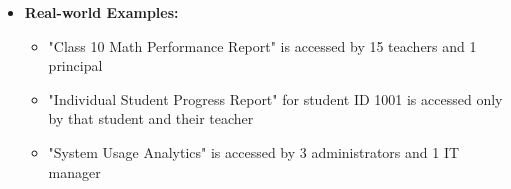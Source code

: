 \documentclass[12pt,a4paper,oneside]{book}
\begin{document}
\begin{itemize}
\begin{itemize}
            \item Teachers can access reports for their students and courses
            \item Administrators can access institution-wide reports and system metrics
            \item Report access is logged for audit and compliance purposes
        \end{itemize}
    \item \textbf{Real-world Examples:}
        \begin{itemize}
            \item "Class 10 Math Performance Report" is accessed by 15 teachers and 1 principal
            \item "Individual Student Progress Report" for student ID 1001 is accessed only by that student and their teacher
            \item "System Usage Analytics" is accessed by 3 administrators and 1 IT manager
        \end{itemize}
\end{itemize}
\end{document}
